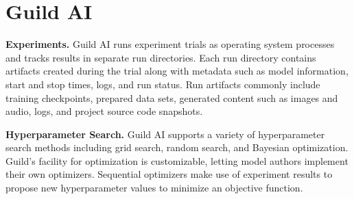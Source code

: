 \documentclass{article}
\begin{document}

\printAffiliationsAndNotice{}

\section{Guild AI}

\textbf{Experiments.} Guild AI runs experiment trials as operating
system processes and tracks results in separate run directories. Each
run directory contains artifacts created during the trial along with
metadata such as model information, start and stop times, logs, and
run status. Run artifacts commonly include training checkpoints,
prepared data sets, generated content such as images and audio, logs,
and project source code snapshots.

\textbf{Hyperparameter Search.} Guild AI supports a variety of
hyperparameter search methods including grid search, random search,
and Bayesian optimization. Guild's facility for optimization is
customizable, letting model authors implement their own
optimizers. Sequential optimizers make use of experiment results to
propose new hyperparameter values to minimize an objective function.
\end{document}
